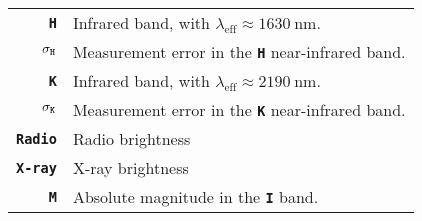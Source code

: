 \begin{tabular}{@{}rp{8cm}@{}}
	\textbf{\texttt{H}} & Infrared band, with $\lambda_\text{eff} \approx \SI{1630}{\nano\meter}$. \\
	$\sigma_\text{\textbf{\texttt{H}}}$ & Measurement error in the \textbf{\texttt{H}} near-infrared band. \\
	\textbf{\texttt{K}} & Infrared band, with $\lambda_\text{eff} \approx \SI{2190}{\nano\meter}$. \\
	$\sigma_\text{\textbf{\texttt{K}}}$ & Measurement error in the \textbf{\texttt{K}} near-infrared band. \\
	\textbf{\texttt{Radio}} & Radio brightness \\
	\textbf{\texttt{X-ray}} & X-ray brightness \\
	\midrule
	\textbf{\texttt{M}} & Absolute magnitude in the \textbf{\texttt{I}} band. \\
	\bottomrule
\end{tabular}
